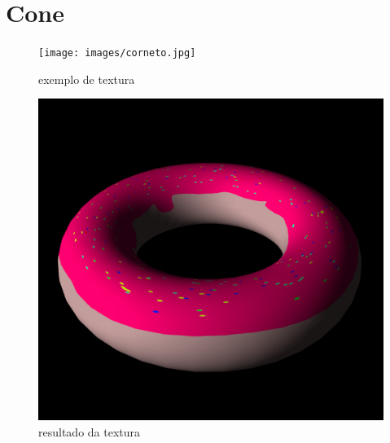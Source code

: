 \documentclass[a4paper]{report}
\begin{document}
\section{Cone}
\begin{figure}[H]
    \centering
    \begin{minipage}{0.40\textwidth}
        \centering
        \texttt{[image: images/corneto.jpg]}
        \caption{exemplo de textura}
    \end{minipage}\hfill
    \begin{minipage}{0.59\textwidth}
        \centering
        \includegraphics[width=\textwidth]{images/donut_rendered.png}
        \caption{resultado da textura}
    \end{minipage}\hfill
\end{figure}
\end{document}
